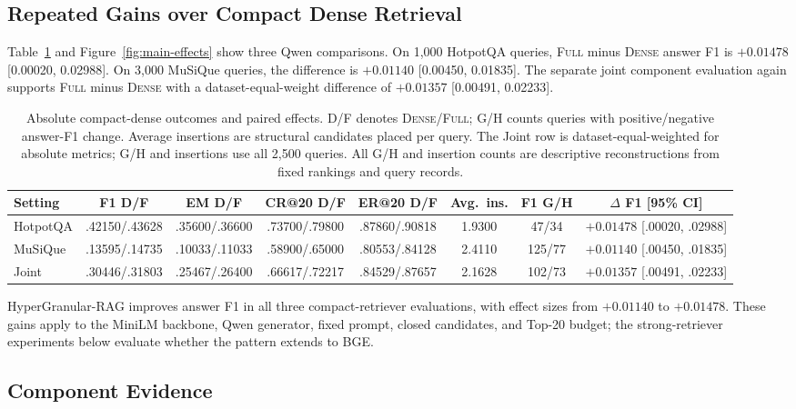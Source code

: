 \documentclass[11pt]{article}
\newcommand{\hgrag}{HyperGranular-RAG\xspace}
\newcommand{\full}{\textsc{Full}\xspace}
\newcommand{\dense}{\textsc{Dense}\xspace}
\begin{document}
\subsection{Repeated Gains over Compact Dense Retrieval}

Table~\ref{tab:compact} and Figure~\ref{fig:main-effects} show three Qwen
comparisons. On 1,000 HotpotQA queries, \full minus \dense answer F1 is
$+0.01478$ [0.00020, 0.02988]. On 3,000 MuSiQue queries, the difference is
$+0.01140$ [0.00450, 0.01835]. The separate joint component evaluation again
supports \full minus \dense with a dataset-equal-weight difference of
$+0.01357$ [0.00491, 0.02233].

\begin{table}[t]
\centering
\scriptsize
\setlength{\tabcolsep}{2.5pt}
\begin{tabular}{@{}lccccccc@{}}
\toprule
Setting & F1 D/F & EM D/F & CR@20 D/F & ER@20 D/F &
Avg.\ ins. & F1 G/H & $\Delta$ F1 [95\% CI] \\
\midrule
HotpotQA & .42150/.43628 & .35600/.36600 & .73700/.79800 &
.87860/.90818 & 1.9300 & 47/34 & $+0.01478$ [.00020, .02988] \\
MuSiQue & .13595/.14735 & .10033/.11033 & .58900/.65000 &
.80553/.84128 & 2.4110 & 125/77 & $+0.01140$ [.00450, .01835] \\
Joint & .30446/.31803 & .25467/.26400 & .66617/.72217 &
.84529/.87657 & 2.1628 & 102/73 & $+0.01357$ [.00491, .02233] \\
\bottomrule
\end{tabular}
\caption{Absolute compact-dense outcomes and paired effects. D/F denotes
\dense/\full; G/H counts queries with positive/negative answer-F1 change.
Average insertions are structural candidates placed per query. The Joint row
is dataset-equal-weighted for absolute metrics; G/H and insertions use all
2,500 queries. All G/H and insertion counts are descriptive reconstructions
from fixed rankings and query records.}
\label{tab:compact}
\end{table}

\hgrag improves answer F1 in all three compact-retriever evaluations, with
effect sizes from $+0.01140$ to $+0.01478$. These gains apply to the MiniLM
backbone, Qwen generator, fixed prompt, closed candidates, and Top-20 budget;
the strong-retriever experiments below evaluate whether the pattern extends to
BGE.

\subsection{Component Evidence}
\end{document}
